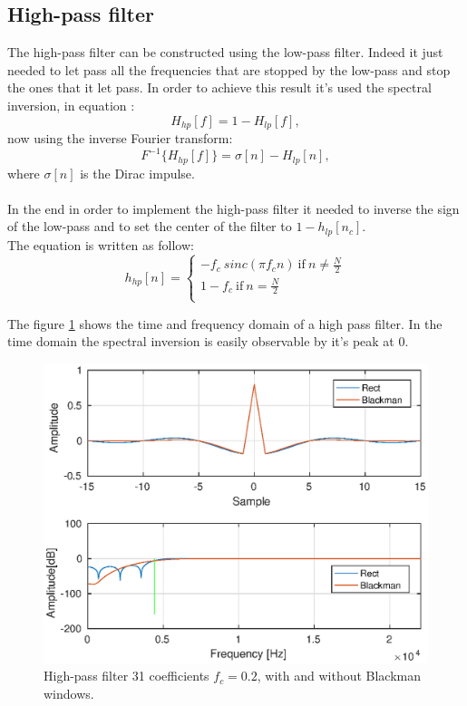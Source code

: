 \documentclass[twoside,twocolumn]{article}
\begin{document}
\subsection{High-pass filter}
The high-pass filter can be constructed using the low-pass filter. Indeed it just needed to let pass all the frequencies that are stopped by the low-pass and stop the ones that it let pass. In order to achieve this result it's used the spectral inversion, in equation :
\begin{equation}
H_{hp}[f]=1-H_{lp}[f],
\end{equation}
now using the inverse Fourier transform:
\begin{equation}
F^{-1}\lbrace H_{hp}[f] \rbrace=\sigma[n]-H_{lp}[n],
\end{equation}
where $\sigma[n]$ is the Dirac impulse.\\ \\
In the end  in order to implement the high-pass filter it needed to inverse the sign of the low-pass and to set the center of the filter to $1-h_{lp}[n_{c}]$.\\
The equation is written as follow:
\begin{equation}
h_{hp}[n]=
\left\{
\begin{aligned}
-f_c\  sinc(\pi f_cn) \ \text{if}\ n\neq \frac{N}{2} \\
1-f_c \ \text{if}\ n=\frac{N}{2}\\
\end{aligned}
\right.
\end{equation}

The figure \ref{highpass} shows the time and frequency domain of a high pass filter. In the time domain the spectral inversion is easily observable by it's peak at 0.
\begin{figure}[h!]
	\centering
	\includegraphics[scale=0.5]{./images/highpass.eps}
	\caption{High-pass filter 31 coefficients $f_c=0.2$, with and without Blackman windows.}
	\label{highpass}
\end{figure}
\end{document}
